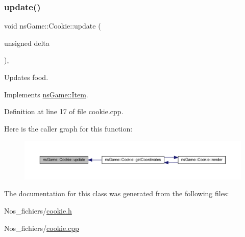 \subsubsection{\texorpdfstring{update()}{update()}}
{\footnotesize\ttfamily void ns\+Game\+::\+Cookie\+::update (\begin{DoxyParamCaption}\item[{unsigned}]{delta }\end{DoxyParamCaption})\hspace{0.3cm}{\ttfamily [override]}, {\ttfamily [virtual]}}



Updates food. 



Implements \hyperlink{structns_game_1_1_item_a96c07d0f91eef0d77e91d1a7397091a1}{ns\+Game\+::\+Item}.



Definition at line 17 of file cookie.\+cpp.

Here is the caller graph for this function\+:\nopagebreak
\begin{figure}[H]
\begin{center}
\leavevmode
\includegraphics[width=350pt]{classns_game_1_1_cookie_aaea5c3967effe908f2676a5ded17aa39_icgraph}
\end{center}
\end{figure}


The documentation for this class was generated from the following files\+:\begin{DoxyCompactItemize}
\item 
Nos\+\_\+fichiers/\hyperlink{cookie_8h}{cookie.\+h}\item 
Nos\+\_\+fichiers/\hyperlink{cookie_8cpp}{cookie.\+cpp}\end{DoxyCompactItemize}
